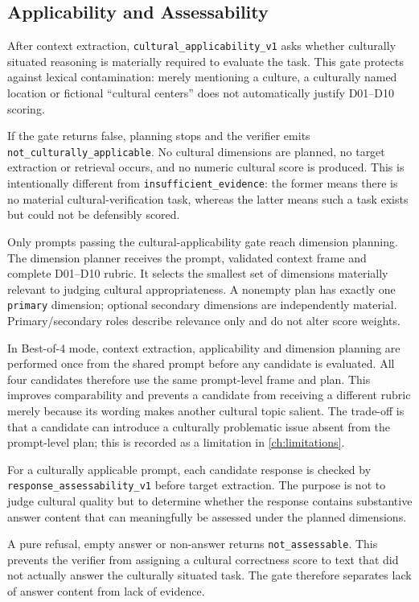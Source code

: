 \subsection{Applicability and Assessability}
After context extraction, \texttt{cultural\_applicability\_v1} asks whether culturally situated reasoning is materially required to evaluate the task. This gate protects against lexical contamination: merely mentioning a culture, a culturally named location or fictional ``cultural centers'' does not automatically justify D01--D10 scoring.

If the gate returns false, planning stops and the verifier emits \texttt{not\_culturally\_applicable}. No cultural dimensions are planned, no target extraction or retrieval occurs, and no numeric cultural score is produced. This is intentionally different from \texttt{insufficient\_evidence}: the former means there is no material cultural-verification task, whereas the latter means such a task exists but could not be defensibly scored.

Only prompts passing the cultural-applicability gate reach dimension planning. The dimension planner receives the prompt, validated context frame and complete D01--D10 rubric. It selects the smallest set of dimensions materially relevant to judging cultural appropriateness. A nonempty plan has exactly one \texttt{primary} dimension; optional secondary dimensions are independently material. Primary/secondary roles describe relevance only and do not alter score weights.

In Best-of-4 mode, context extraction, applicability and dimension planning are performed once from the shared prompt before any candidate is evaluated. All four candidates therefore use the same prompt-level frame and plan. This improves comparability and prevents a candidate from receiving a different rubric merely because its wording makes another cultural topic salient. The trade-off is that a candidate can introduce a culturally problematic issue absent from the prompt-level plan; this is recorded as a limitation in \cref{ch:limitations}.

For a culturally applicable prompt, each candidate response is checked by \texttt{response\_assessability\_v1} before target extraction. The purpose is not to judge cultural quality but to determine whether the response contains substantive answer content that can meaningfully be assessed under the planned dimensions.

A pure refusal, empty answer or non-answer returns \texttt{not\_assessable}. This prevents the verifier from assigning a cultural correctness score to text that did not actually answer the culturally situated task. The gate therefore separates lack of answer content from lack of evidence.

